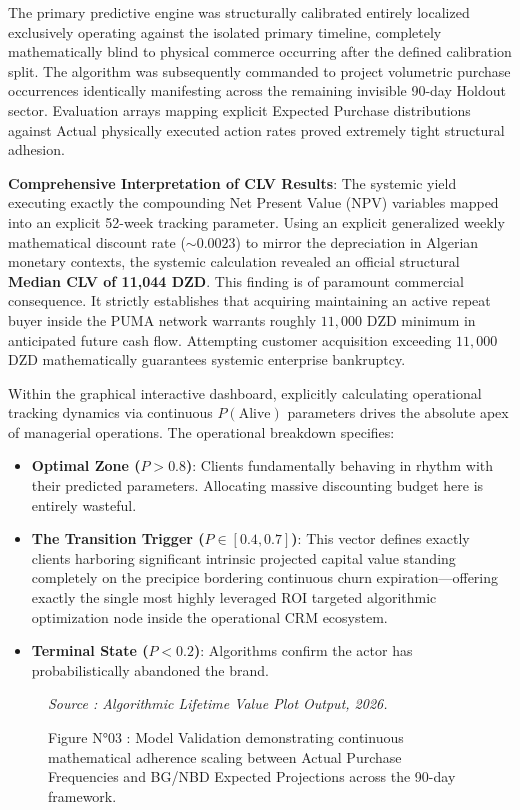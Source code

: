 \documentclass[12pt,a4paper]{report}
\begin{document}
The primary predictive engine was structurally calibrated entirely localized exclusively operating against the isolated primary timeline, completely mathematically blind to physical commerce occurring after the defined calibration split. The algorithm was subsequently commanded to project volumetric purchase occurrences identically manifesting across the remaining invisible 90-day Holdout sector. Evaluation arrays mapping explicit Expected Purchase distributions against Actual physically executed action rates proved extremely tight structural adhesion.

\textbf{Comprehensive Interpretation of CLV Results}: The systemic yield executing exactly the compounding Net Present Value (NPV) variables mapped into an explicit 52-week tracking parameter. Using an explicit generalized weekly mathematical discount rate ($\sim 0.0023$) to mirror the depreciation in Algerian monetary contexts, the systemic calculation revealed an official structural \textbf{Median CLV of 11,044 DZD}. 
This finding is of paramount commercial consequence. It strictly establishes that acquiring maintaining an active repeat buyer inside the PUMA network warrants roughly $11,000$ DZD minimum in anticipated future cash flow. Attempting customer acquisition exceeding $11,000$ DZD mathematically guarantees systemic enterprise bankruptcy. 

Within the graphical interactive dashboard, explicitly calculating operational tracking dynamics via continuous $P(\text{Alive})$ parameters drives the absolute apex of managerial operations. The operational breakdown specifies:
\begin{itemize}
    \item \textbf{Optimal Zone ($P > 0.8$)}: Clients fundamentally behaving in rhythm with their predicted parameters. Allocating massive discounting budget here is entirely wasteful.
    \item \textbf{The Transition Trigger ($P \in [0.4, 0.7]$)}: This vector defines exactly clients harboring significant intrinsic projected capital value standing completely on the precipice bordering continuous churn expiration—offering exactly the single most highly leveraged ROI targeted algorithmic optimization node inside the operational CRM ecosystem.
    \item \textbf{Terminal State ($P < 0.2$)}: Algorithms confirm the actor has probabilistically abandoned the brand.
\end{itemize}

\begin{figure}[H]
    \centering
    \vspace{4cm} 
    \caption{Figure N°03 : Model Validation demonstrating continuous mathematical adherence scaling between Actual Purchase Frequencies and BG/NBD Expected Projections across the 90-day framework.}
    \vspace{0.2cm}
    \footnotesize{\textit{Source : Algorithmic Lifetime Value Plot Output, 2026.}}
    \label{fig:clv_validation}
\end{figure}
\end{document}
